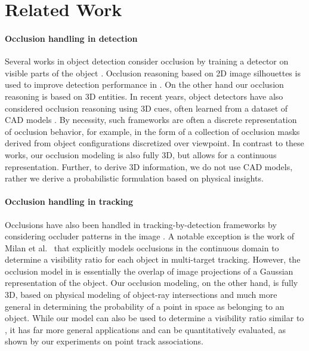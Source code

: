 \section{Related Work}
\label{sec:related}

\paragraph{Occlusion handling in detection}
Several works in object detection consider occlusion by training a detector on visible parts of the object \cite{Gao_etal_2011}. Occlusion reasoning based on 2D image silhouettes is used to improve detection performance in \cite{Hsiao_Herbert_2012}. On the other hand our occlusion reasoning is based on 3D entities. In recent years, object detectors have also considered occlusion reasoning using 3D cues, often learned from a dataset of CAD models \cite{Pepik_etal_2012,Pepik_etal_2013,Xiang_Savarese_2013}. By necessity, such frameworks are often a discrete representation of occlusion behavior, for example, in the form of a collection of occlusion masks derived from object configurations discretized over viewpoint. In contrast to these works, our occlusion modeling is also fully 3D, but allows for a continuous representation. Further, to derive 3D information, we do not use CAD models, rather we derive a probabilistic formulation based on physical insights.


\vspace{-0.3cm}
\paragraph{Occlusion handling in tracking}
Occlusions have also been handled in tracking-by-detection frameworks by considering occluder patterns in the image \cite{Kwak_etal_2012,Wu_Nevatia_2007}. A notable exception is the work of Milan et al.~\cite{Milan_etal_2014} that explicitly models occlusions in the continuous domain to determine a visibility ratio for each object in multi-target tracking. However, the occlusion model in \cite{Milan_etal_2014} is essentially the overlap of image projections of a Gaussian representation of the object. Our occlusion modeling, on the other hand, is fully 3D, based on physical modeling of object-ray intersections and much more general in determining the probability of a point in space as belonging to an object. While our model can also be used to determine a visibility ratio similar to \cite{Milan_etal_2014}, it has far more general applications and can be quantitatively evaluated, as shown by our experiments on point track associations.


